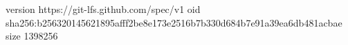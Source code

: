 version https://git-lfs.github.com/spec/v1
oid sha256:b256320145621895afff2be8e173e2516b7b330d684b7e91a39ea6db481acbae
size 1398256
